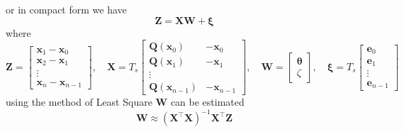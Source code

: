 \documentclass[12pt]{iopart}		%
\begin{document}
or in compact form we have
\begin{equation}
 \mathbf Z=\mathbf X \mathbf W+\boldsymbol \xi
\end{equation}
where
\begin{equation}
 \mathbf Z=\left[\begin{array}{cccc} \mathbf x_{1}-\mathbf x_{0}\\
\mathbf x_{2}-\mathbf x_{1}\\\vdots\\
\mathbf x_{n}-\mathbf x_{n-1}\end{array}\right],\quad \mathbf X=T_s\left[\begin{array}{cccc}\mathbf Q(\mathbf x_0)&-\mathbf x_{0}\\
\mathbf Q(\mathbf x_1)&-\mathbf x_{1}\\\vdots\\ \mathbf Q(\mathbf x_{n-1})&-\mathbf x_{n-1}\end{array}\right]
,\quad \mathbf W=\left[\begin{array}{cc} \boldsymbol{\theta} \\ \zeta\end{array}\right],\quad \boldsymbol \xi=T_s\left[\begin{array}{cccc}\mathbf e_0\\\mathbf e_1\\\vdots\\\mathbf e_{n-1}\end{array}\right]
\end{equation}
using the method of Least Square $ \mathbf W$ can be estimated
\begin{equation}
 \mathbf W\approx(\mathbf X^\top\mathbf X)^{-1}\mathbf X^\top\mathbf Z
\end{equation}
\end{document}
